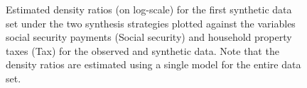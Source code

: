 \documentclass[
]{article}
\begin{document}
\begin{figure}[t]


\caption{\label{fig-app-utility-results}Estimated density ratios (on
log-scale) for the first synthetic data set under the two synthesis
strategies plotted against the variables social security payments
(Social security) and household property taxes (Tax) for the observed
and synthetic data. Note that the density ratios are estimated using a
single model for the entire data set.}

\end{figure}%

\linespread{2}
\end{document}
